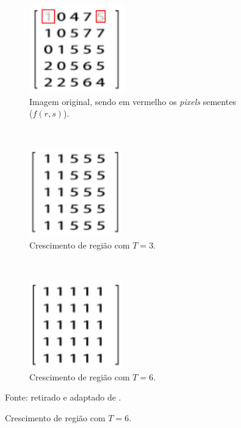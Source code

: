 \begin{figure}[H]
   \caption{Ilustração do crescimento de região.}
   \centering
   \label{segment:fig:4}
    \begin{subfigure}[t]{0.45\textwidth}
        \centering
        \includegraphics[height=1.5in]{recursos/imagens/image_seg/m1.png}
        \caption{Imagem original, sendo em vermelho os \textit{pixels} sementes ($f(r,s)$).}
        \label{segment:fig:4.1}
    \end{subfigure}
    ~ 
    \begin{subfigure}[t]{0.45\textwidth}
        \centering
        \includegraphics[height=1.5in]{recursos/imagens/image_seg/m2.png}
        \caption{Crescimento de região com $T = 3$.}
        \label{segment:fig:4.2}
    \end{subfigure}
    ~ 

    \begin{subfigure}[t]{0.45\textwidth}
        \centering
        \includegraphics[height=1.5in]{recursos/imagens/image_seg/m3.png}
        \caption{Crescimento de região com $T = 6$.}
        \label{segment:fig:4.3}
    \end{subfigure}

    Fonte: retirado e adaptado de \cite{Yuheng2017}.
\end{figure}

